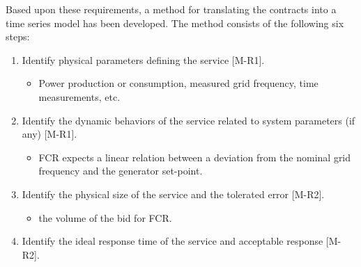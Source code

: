Based upon these requirements, a method for translating the contracts into a time series model has been developed. The method consists of the following six steps:
\begin{enumerate}
	\item Identify physical parameters defining the service [M-R1].
  \begin{itemize}
    \item \eg Power production or consumption, measured grid frequency, time measurements, etc.%
  \end{itemize}
  \item Identify the dynamic behaviors of the service related to system parameters (if any) [M-R1].
  \begin{itemize}
    \item \eg FCR expects a linear relation between a deviation from the nominal grid frequency and the generator set-point.%
  \end{itemize}
  \item Identify the physical size of the service and the tolerated error [M-R2]. %
  \begin{itemize}
    \item \eg the volume of the bid for FCR. %
  \end{itemize}
  \item Identify the ideal response time of the service and acceptable response [M-R2].
  \begin{itemize}

\end{itemize}
\end{enumerate}
